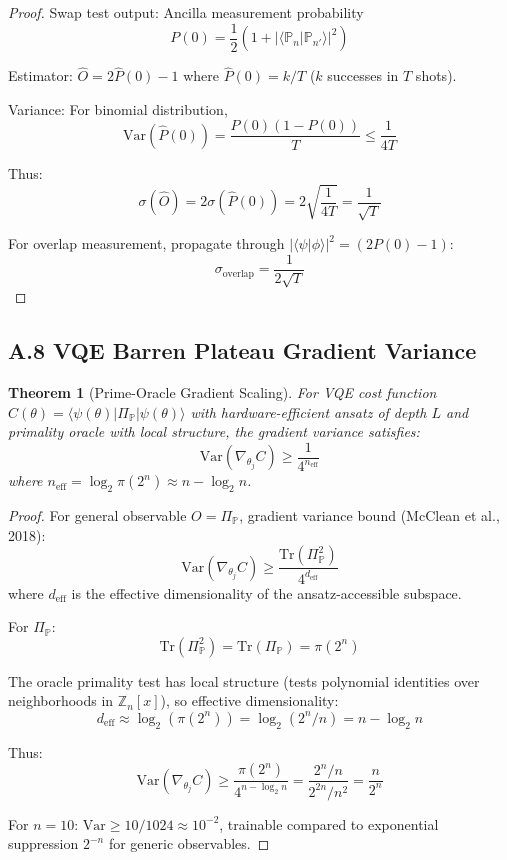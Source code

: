 \documentclass[11pt,letterpaper]{article}
\newtheorem{theorem}{Theorem}
\begin{document}
\begin{proof}
Swap test output: Ancilla measurement probability
\[
P(0) = \frac{1}{2}(1 + |\langle \mathbb{P}_n | \mathbb{P}_{n'} \rangle|^2)
\]

Estimator: $\hat{O} = 2\hat{P}(0) - 1$ where $\hat{P}(0) = k/T$ ($k$ successes in $T$ shots).

Variance: For binomial distribution,
\[
\text{Var}(\hat{P}(0)) = \frac{P(0)(1-P(0))}{T} \leq \frac{1}{4T}
\]

Thus:
\[
\sigma(\hat{O}) = 2\sigma(\hat{P}(0)) = 2\sqrt{\frac{1}{4T}} = \frac{1}{\sqrt{T}}
\]

For overlap measurement, propagate through $|\langle \psi|\phi\rangle|^2 = (2P(0)-1)$:
\[
\sigma_{\text{overlap}} = \frac{1}{2\sqrt{T}}
\]
\end{proof}

\subsection{A.8 VQE Barren Plateau Gradient Variance}

\begin{theorem}[Prime-Oracle Gradient Scaling]
For VQE cost function $C(\theta) = \langle \psi(\theta)|\Pi_{\mathbb{P}}|\psi(\theta)\rangle$ with hardware-efficient ansatz of depth $L$ and primality oracle with local structure, the gradient variance satisfies:
\[
\text{Var}(\nabla_{\theta_j} C) \geq \frac{1}{4^{n_{\text{eff}}}}
\]
where $n_{\text{eff}} = \log_2 \pi(2^n) \approx n - \log_2 n$.
\end{theorem}

\begin{proof}
For general observable $O = \Pi_{\mathbb{P}}$, gradient variance bound (McClean et al., 2018):
\[
\text{Var}(\nabla_{\theta_j} C) \geq \frac{\text{Tr}(\Pi_{\mathbb{P}}^2)}{4^{d_{\text{eff}}}}
\]
where $d_{\text{eff}}$ is the effective dimensionality of the ansatz-accessible subspace.

For $\Pi_{\mathbb{P}}$:
\[
\text{Tr}(\Pi_{\mathbb{P}}^2) = \text{Tr}(\Pi_{\mathbb{P}}) = \pi(2^n)
\]

The oracle primality test has local structure (tests polynomial identities over neighborhoods in $\mathbb{Z}_n[x]$), so effective dimensionality:
\[
d_{\text{eff}} \approx \log_2(\pi(2^n)) = \log_2(2^n/n) = n - \log_2 n
\]

Thus:
\[
\text{Var}(\nabla_{\theta_j} C) \geq \frac{\pi(2^n)}{4^{n - \log_2 n}} = \frac{2^n/n}{2^{2n}/n^2} = \frac{n}{2^n}
\]

For $n=10$: $\text{Var} \geq 10/1024 \approx 10^{-2}$, trainable compared to exponential suppression $2^{-n}$ for generic observables.
\end{proof}
\end{document}
